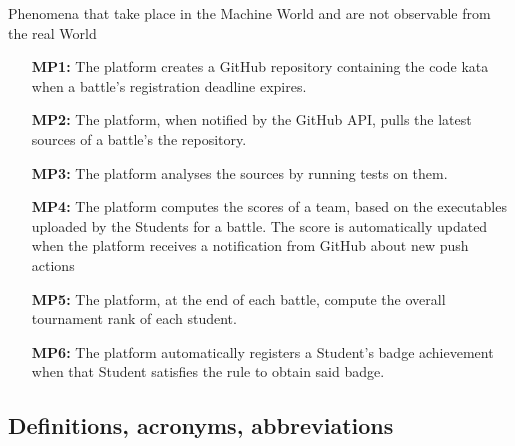 \documentclass{article}
\newcounter{subsubsubsection}[subsubsection]
\begin{document}
Phenomena that take place in the Machine World and are not observable from the real World
\begin{enumerate}
    \item[\textbf{MP1:}] The platform creates a GitHub repository containing the code kata when a battle's registration deadline expires.
    \item[\textbf{MP2:}] The platform, when notified by the GitHub API, pulls the latest sources of a battle's the repository.
    \item[\textbf{MP3:}] The platform analyses the sources by running tests on them.
    \item[\textbf{MP4:}] The platform computes the scores of a team, based on the executables uploaded by the Students for a battle. 
    The score is automatically updated when the platform receives a notification from GitHub about new push actions%
    \item[\textbf{MP5:}] The platform, at the end of each battle, compute the overall tournament rank of each student.
    \item[\textbf{MP6:}] The platform automatically registers a Student's badge achievement when that Student satisfies the rule to obtain said badge.
\end{enumerate}


\subsection{Definitions, acronyms, abbreviations}
\end{document}
